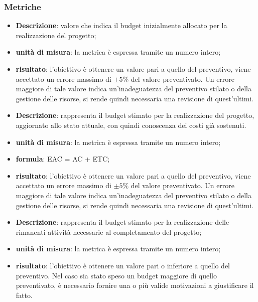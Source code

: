 		\subsubsection{Metriche}
		\begin{itemize}
			\item \textbf{Descrizione}: valore che indica il budget inizialmente allocato per la realizzazione del progetto;
			\item \textbf{unità di misura}: la metrica è espressa tramite un numero intero;
			\item \textbf{risultato}: l'obiettivo è ottenere un valore pari a quello del preventivo, viene accettato un errore massimo di $\pm{}5\%$ del valore preventivato. Un errore maggiore di tale valore indica un'inadeguatezza del preventivo stilato o della gestione delle risorse, si rende quindi necessaria una revisione di quest'ultimi.
		\end{itemize}
		\begin{itemize}
			\item \textbf{Descrizione}: rappresenta il budget stimato per la realizzazione del progetto, aggiornato allo stato attuale, con quindi conoscenza dei costi già sostenuti.
			\item \textbf{unità di misura}: la metrica è espressa tramite un numero intero;
			\item \textbf{formula}: EAC = AC + ETC;
			\item \textbf{risultato}: l'obiettivo è ottenere un valore pari a quello del preventivo, viene accettato un errore massimo di $\pm{}5\%$ del valore preventivato. Un errore maggiore di tale valore indica un'inadeguatezza del preventivo stilato o della gestione delle risorse, si rende quindi necessaria una revisione di quest'ultimi.
		\end{itemize}
		\begin{itemize}
			\item \textbf{Descrizione}: rappresenta il budget stimato per la realizzazione delle rimanenti attività necessarie al completamento del progetto;
			\item \textbf{unità di misura}: la metrica è espressa tramite un numero intero;
			\item \textbf{risultato}: l'obiettivo è ottenere un valore pari o inferiore a quello del preventivo. Nel caso sia stato speso un budget maggiore di quello preventivato, è necessario fornire una o più valide motivazioni a giustificare il fatto.
		\end{itemize}
